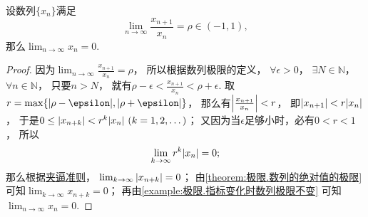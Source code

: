 \begin{proposition}
设数列\(\{x_n\}\)满足\[
	\lim_{n\to\infty} \frac{x_{n+1}}{x_n} = \rho \in (-1,1),
\]
那么\(\lim_{n\to\infty} x_n = 0\).
\begin{proof}
因为\(\lim_{n\to\infty} \frac{x_{n+1}}{x_n} = \rho\)，
所以根据数列极限的定义，
\(\forall\epsilon>0\)，
\(\exists N\in\mathbb{N}\)，
\(\forall n\in\mathbb{N}\)，
只要\(n > N\)，
就有\(\rho-\epsilon < \frac{x_{n+1}}{x_n} < \rho+\epsilon\).
取\(r=\max\{\abs{\rho-\epsilon},\abs{\rho+\epsilon}\}\)，
那么有\(\abs{\frac{x_{n+1}}{x_n}} < r\)，
即\(\abs{x_{n+1}} < r \abs{x_n}\)，
于是\(0 \leq \abs{x_{n+k}} < r^k \abs{x_n}\ (k=1,2,\dotsc)\)；
又因为当\(\epsilon\)足够小时，必有\(0<r<1\)，
所以\[
	\lim_{k\to\infty} r^k \abs{x_n} = 0;
\]
那么根据\hyperref[theorem:数列极限.夹逼准则]{夹逼准则}，
\(\lim_{k\to\infty} \abs{x_{n+k}} = 0\)；
由\cref{theorem:极限.数列的绝对值的极限} 可知\(\lim_{k\to\infty} x_{n+k} = 0\)；
再由\cref{example:极限.指标变化时数列极限不变} 可知\(\lim_{n\to\infty} x_n = 0\).
\end{proof}
\end{proposition}

